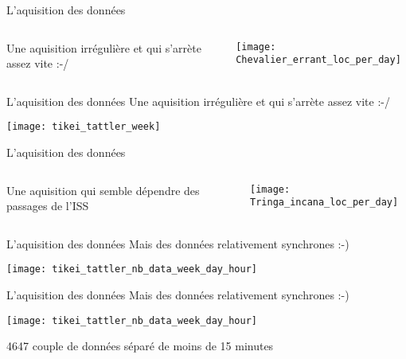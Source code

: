 \documentclass[10pt]{beamer}
\begin{document}
\begin{frame}{L'aquisition des données}
  \begin{columns}
    \begin{column}[c]{0.4\textwidth}
      Une aquisition irrégulière et qui s'arrète assez vite :-/
    \end{column}
    \begin{column}[c]{0.6\textwidth}
      \begin{center}
        \texttt{[image: Chevalier\_errant\_loc\_per\_day]}
      \end{center}
    \end{column}
  \end{columns}
\end{frame}


\begin{frame}{L'aquisition des données}
  Une aquisition irrégulière et qui s'arrète assez vite :-/
  \begin{center}
    \texttt{[image: tikei\_tattler\_week]}    
  \end{center}
\end{frame}


\begin{frame}{L'aquisition des données}
  \begin{columns}
    \begin{column}[c]{0.4\textwidth}
      Une aquisition qui semble dépendre des passages de l'ISS
    \end{column}
    \begin{column}[c]{0.6\textwidth}
      \begin{center}
        \texttt{[image: Tringa\_incana\_loc\_per\_day]}
      \end{center}
    \end{column}
  \end{columns}
\end{frame}


\begin{frame}{L'aquisition des données}
  Mais des données relativement synchrones :-)\\
  \begin{center}
    \texttt{[image: tikei\_tattler\_nb\_data\_week\_day\_hour]}
  \end{center}
\end{frame}

\begin{frame}{L'aquisition des données}
  Mais des données relativement synchrones :-)\\
  \begin{center}
    \texttt{[image: tikei\_tattler\_nb\_data\_week\_day\_hour]}
  \end{center}
    {\footnotesize 4647 couple de données séparé de moins de 15 minutes}
\end{frame}
\end{document}
